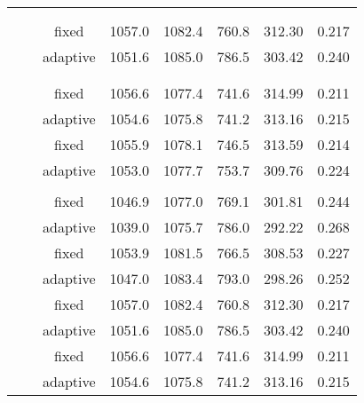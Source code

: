 \begin{table}
\begin{tabular}[t]{cccccccc}
\cmidrule{2-8}
\hspace{1em}\addlinespace[0.3em]
\multicolumn{8}{l}{\textit{Tricube}}\\
\hspace{1em}\addlinespace[0.3em]
\multicolumn{8}{l}{\textit{Tricube}}\\
\hspace{1em}\hspace{1em} &  & fixed & 1057.0 & 1082.4 & 760.8 & 312.30 & 0.217\\
\cmidrule{3-8}
\hspace{1em}\hspace{1em}\hspace{1em}\hspace{1em} &  & adaptive & 1051.6 & 1085.0 & 786.5 & 303.42 & 0.240\\
\cmidrule{2-8}
\hspace{1em}\addlinespace[0.3em]
\multicolumn{8}{l}{\textit{Boxcar}}\\
\hspace{1em}\addlinespace[0.3em]
\multicolumn{8}{l}{\textit{Boxcar}}\\
\hspace{1em}\hspace{1em} &  & fixed & 1056.6 & 1077.4 & 741.6 & 314.99 & 0.211\\
\cmidrule{3-8}
\hspace{1em}\hspace{1em}\hspace{1em}\hspace{1em} &  & adaptive & 1054.6 & 1075.8 & 741.2 & 313.16 & 0.215\\
\cmidrule{1-8}
 &  & fixed & 1055.9 & 1078.1 & 746.5 & 313.59 & 0.214\\
\cmidrule{3-8}
\hspace{1em}\hspace{1em} &  & adaptive & 1053.0 & 1077.7 & 753.7 & 309.76 & 0.224\\
\cmidrule{2-8}
\addlinespace[0.3em]
\multicolumn{8}{l}{\textit{Exponential}}\\
\hspace{1em}\hspace{1em} &  & fixed & 1046.9 & 1077.0 & 769.1 & 301.81 & 0.244\\
\cmidrule{3-8}
\hspace{1em}\hspace{1em} &  & adaptive & 1039.0 & 1075.7 & 786.0 & 292.22 & 0.268\\
\cmidrule{2-8}
 &  & fixed & 1053.9 & 1081.5 & 766.5 & 308.53 & 0.227\\
\cmidrule{3-8}
 &  & adaptive & 1047.0 & 1083.4 & 793.0 & 298.26 & 0.252\\
\cmidrule{2-8}
 &  & fixed & 1057.0 & 1082.4 & 760.8 & 312.30 & 0.217\\
\cmidrule{3-8}
 &  & adaptive & 1051.6 & 1085.0 & 786.5 & 303.42 & 0.240\\
\cmidrule{2-8}
 &  & fixed & 1056.6 & 1077.4 & 741.6 & 314.99 & 0.211\\
\cmidrule{3-8}
 &  & adaptive & 1054.6 & 1075.8 & 741.2 & 313.16 & 0.215\\
\bottomrule
\end{tabular}
\end{table}